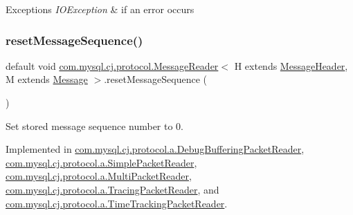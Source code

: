 \begin{DoxyExceptions}{Exceptions}
{\em I\+O\+Exception} & if an error occurs \\
\hline
\end{DoxyExceptions}
\mbox{\label{interfacecom_1_1mysql_1_1cj_1_1protocol_1_1_message_reader_a3161e55ab8c1bb4d533aa6d2700fb14d}} 
\subsubsection{\texorpdfstring{reset\+Message\+Sequence()}{resetMessageSequence()}}
{\footnotesize\ttfamily default void \mbox{\hyperlink{interfacecom_1_1mysql_1_1cj_1_1protocol_1_1_message_reader}{com.\+mysql.\+cj.\+protocol.\+Message\+Reader}}$<$ H extends \mbox{\hyperlink{interfacecom_1_1mysql_1_1cj_1_1protocol_1_1_message_header}{Message\+Header}}, M extends \mbox{\hyperlink{interfacecom_1_1mysql_1_1cj_1_1protocol_1_1_message}{Message}} $>$.reset\+Message\+Sequence (\begin{DoxyParamCaption}{ }\end{DoxyParamCaption})}

Set stored message sequence number to 0. 

Implemented in \mbox{\hyperlink{classcom_1_1mysql_1_1cj_1_1protocol_1_1a_1_1_debug_buffering_packet_reader_a6739a6433fdce69bb684e15048481dc2}{com.\+mysql.\+cj.\+protocol.\+a.\+Debug\+Buffering\+Packet\+Reader}}, \mbox{\hyperlink{classcom_1_1mysql_1_1cj_1_1protocol_1_1a_1_1_simple_packet_reader_a2dc67eb25eaee9e611b6fe3e9876877a}{com.\+mysql.\+cj.\+protocol.\+a.\+Simple\+Packet\+Reader}}, \mbox{\hyperlink{classcom_1_1mysql_1_1cj_1_1protocol_1_1a_1_1_multi_packet_reader_ac0fa7a5f40fc65548bdb17241152b81c}{com.\+mysql.\+cj.\+protocol.\+a.\+Multi\+Packet\+Reader}}, \mbox{\hyperlink{classcom_1_1mysql_1_1cj_1_1protocol_1_1a_1_1_tracing_packet_reader_a750a22688863ef18d02baaccd7f8475d}{com.\+mysql.\+cj.\+protocol.\+a.\+Tracing\+Packet\+Reader}}, and \mbox{\hyperlink{classcom_1_1mysql_1_1cj_1_1protocol_1_1a_1_1_time_tracking_packet_reader_a1029b1583cd042d202fa0caa956a13c2}{com.\+mysql.\+cj.\+protocol.\+a.\+Time\+Tracking\+Packet\+Reader}}.

